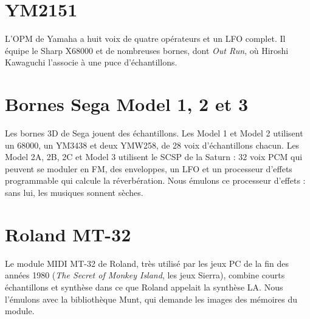\section{YM2151}
L'OPM de Yamaha a huit voix de quatre opérateurs et un LFO complet. Il équipe le Sharp X68000 et de nombreuses bornes,
dont \emph{Out Run}, où Hiroshi Kawaguchi l'associe à une puce d'échantillons.

\section{Bornes Sega Model 1, 2 et 3}
Les bornes 3D de Sega jouent des échantillons. Les Model 1 et Model 2 utilisent un 68000, un YM3438 et deux YMW258,
de 28 voix d'échantillons chacun. Les Model 2A, 2B, 2C et Model 3 utilisent le SCSP de la Saturn : 32 voix PCM qui
peuvent se moduler en FM, des enveloppes, un LFO et un processeur d'effets programmable qui calcule la
réverbération. Nous émulons ce processeur d'effets : sans lui, les musiques sonnent sèches.

\section{Roland MT-32}
Le module MIDI MT-32 de Roland, très utilisé par les jeux PC de la fin des années 1980 (\emph{The Secret of Monkey
Island}, les jeux Sierra), combine courts échantillons et synthèse dans ce que Roland appelait la synthèse LA. Nous
l'émulons avec la bibliothèque Munt, qui demande les images des mémoires du module.
